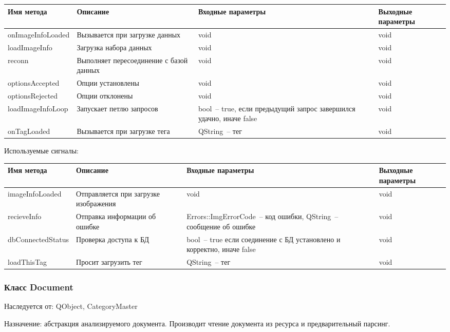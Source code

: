 \documentclass[a4paper,14pt,russian]{extreport}
\begin{document}
\begin{longtable}{|m{3 cm}|m{3 cm}|m{4 cm}|m{4 cm}|}
\hline
Имя метода & Описание & Входные параметры & Выходные параметры \\
\hline
{on\-Image\-Info\-Loaded} & Вызывается при загрузке данных & void & void \\
\hline
{load\-Image\-Info} & Загрузка набора данных & void & void \\
\hline
reconn & Выполняет пересоединение с базой данных & void & void \\
\hline
{options\-Accepted} & Опции установлены & void & void \\
\hline
{options\-Rejected} & Опции отклонены & void & void \\
\hline
{load\-Image\-Info\-Loop} & Запускает петлю запросов & bool~-- true, если предыдущий запрос завершился удачно, иначе false & void \\
\hline
{on\-Tag\-Loaded} & Вызывается при загрузке тега & QString~-- тег & void \\
\hline
\end{longtable}

Используемые сигналы:

\begin{longtable}{|m{3 cm}|m{3 cm}|m{4 cm}|m{4 cm}|}
\hline
Имя метода & Описание & Входные параметры & Выходные параметры \\
\hline
{image\-Info\-Loaded} & Отправляется при загрузке изображения & void & void \\
\hline
{recieve\-Info} & Отправка информации об ошибке & {Errors::Img\-Error\-Code}~-- код ошибки, QString~-- сообщение об ошибке & void \\
\hline
{db\-Connected\-Status} & Проверка доступа к БД & bool~-- true если соединение с БД установлено и корректно, иначе false & void \\
\hline
{load\-This\-Tag} & Просит загрузить тег & QString~-- тег & void \\
\hline
\end{longtable}

\subsubsection{Класс Document}

Наследуется от: QObject, CategoryMaster

Назначение: абстракция анализируемого документа. Производит чтение документа из ресурса и предварительный парсинг.
\end{document}
